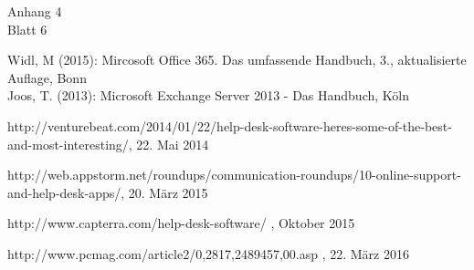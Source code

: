 \begin{flushright}
Anhang 4\\
Blatt 6\\
\end{flushright}

\newpage


\noindent
Widl, M (2015): Mircosoft Office 365. Das umfassende Handbuch, 3., aktualisierte Auflage, Bonn\\
\noindent
Joos, T. (2013): Microsoft Exchange Server 2013 - Das Handbuch, Köln

\noindent
http://venturebeat.com/2014/01/22/help-desk-software-heres-some-of-the-best-and-most-interesting/, 22. Mai 2014

\noindent
http://web.appstorm.net/roundups/communication-roundups/10-online-support-and-help-desk-apps/, 20. März 2015

\noindent
http://www.capterra.com/help-desk-software/ , Oktober 2015

\noindent
http://www.pcmag.com/article2/0,2817,2489457,00.asp , 22. März 2016



